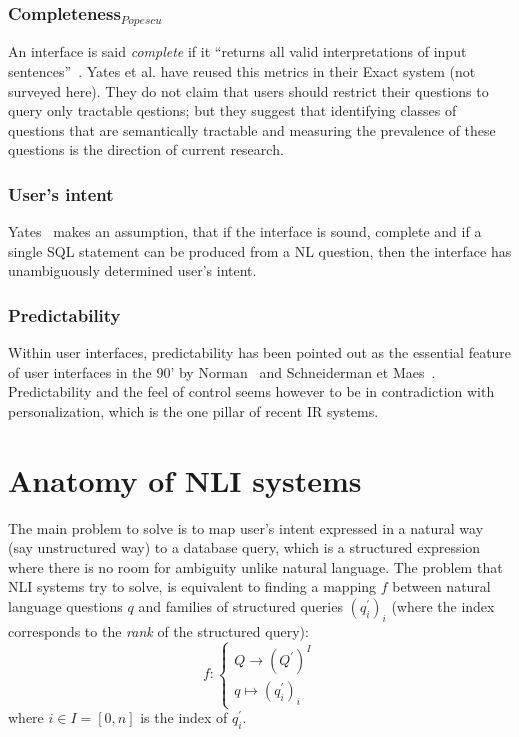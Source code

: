 \documentclass[10pt,journal,letterpaper,compsoc]{IEEEtran}
\begin{document}
\subsubsection{Completeness$_{Popescu}$}
An interface is said {\it complete} if it ``returns all valid interpretations of
input sentences''~\cite{Yates:2003:RNL:604045.604075}.
Yates et al. have reused this metrics in their {\sc Exact} system (not surveyed
here). They do not claim that users should restrict their questions to query
only tractable qestions; but they suggest that identifying classes of questions
that are semantically tractable and measuring the prevalence of these questions
is the direction of current research.


\subsubsection{User's intent}
Yates~\cite{Yates:2003:RNL:604045.604075} makes an assumption, that if the
interface is sound, complete and if a single SQL statement can be produced from
a NL question, then the interface has unambiguously determined user's intent. 

\subsubsection{Predictability}
Within user interfaces, predictability has been pointed out as the essential
feature of user interfaces in the 90' by
Norman~\cite{Norman:1994:MPI:176789.176796} and Schneiderman et
Maes~\cite{Shneiderman:1997:DMV:267505.267514}. 
Predictability and the feel of control seems however to be in contradiction with
personalization, which is the one pillar of recent IR systems. 
















\section{Anatomy of NLI systems}
\label{sec:anatomy}
The main problem to solve is to map user's intent expressed in a natural way
(say unstructured way) to a database query, which is a structured expression
where there is no room for ambiguity unlike natural language. The problem that
NLI systems try to solve, is equivalent to finding a mapping $f$ between natural
language questions $q$ and families of structured queries $(q^\prime_i)_i$
(where the index corresponds to the \emph{rank} of the structured query):
\begin{equation}
f:\left\{
\begin{array}{l}
Q\rightarrow (Q^\prime)^I\\
q\mapsto(q^\prime_i)_i
\end{array}\right.
\end{equation}
where $i\in I=[0,n]$ is the index of $q^\prime_i$.
 
\end{document}

